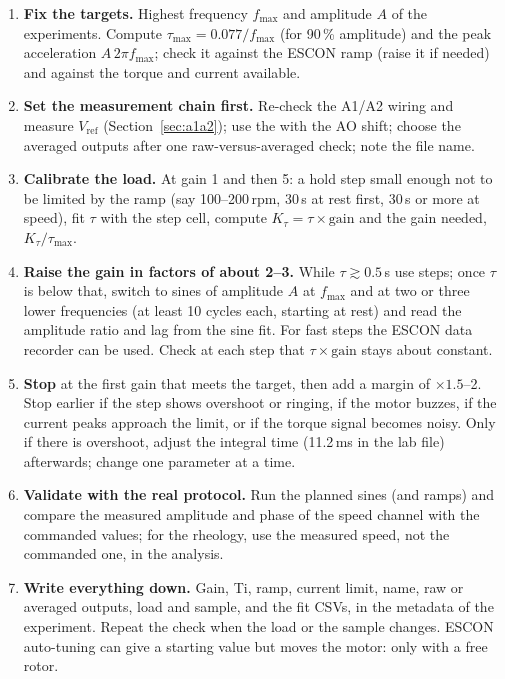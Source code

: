 \documentclass[a4paper,11pt]{article}
\newcommand{\code}[1]{\texttt{\detokenize{#1}}}
\begin{document}
\begin{enumerate}
  \item \textbf{Fix the targets.} Highest frequency $f_{\max}$ and amplitude $A$ of the experiments. Compute $\tau_{\max}=0.077/f_{\max}$ (for 90\,\% amplitude) and the peak acceleration $A\,2\pi f_{\max}$; check it against the ESCON ramp (raise it if needed) and against the torque and current available.
  \item \textbf{Set the measurement chain first.} Re-check the A1/A2 wiring and measure $V_{\mathrm{ref}}$ (Section~\ref{sec:a1a2}); use the \code{.edc} with the AO shift; choose the averaged outputs after one raw-versus-averaged check; note the \code{.edc} file name.
  \item \textbf{Calibrate the load.} At gain 1 and then 5: a hold step small enough not to be limited by the ramp (say 100--200\,rpm, 30\,s at rest first, 30\,s or more at speed), fit $\tau$ with the step cell, compute $K_\tau=\tau\times\text{gain}$ and the gain needed, $K_\tau/\tau_{\max}$.
  \item \textbf{Raise the gain in factors of about 2--3.} While $\tau\gtrsim0.5$\,s use steps; once $\tau$ is below that, switch to sines of amplitude $A$ at $f_{\max}$ and at two or three lower frequencies (at least 10 cycles each, starting at rest) and read the amplitude ratio and lag from the sine fit. For fast steps the ESCON data recorder can be used. Check at each step that $\tau\times\text{gain}$ stays about constant.
  \item \textbf{Stop} at the first gain that meets the target, then add a margin of $\times1.5$--2. Stop earlier if the step shows overshoot or ringing, if the motor buzzes, if the current peaks approach the limit, or if the torque signal becomes noisy. Only if there is overshoot, adjust the integral time (11.2\,ms in the lab file) afterwards; change one parameter at a time.
  \item \textbf{Validate with the real protocol.} Run the planned sines (and ramps) and compare the measured amplitude and phase of the speed channel with the commanded values; for the rheology, use the measured speed, not the commanded one, in the analysis.
  \item \textbf{Write everything down.} Gain, Ti, ramp, current limit, \code{.edc} name, raw or averaged outputs, load and sample, and the fit CSVs, in the metadata of the experiment. Repeat the check when the load or the sample changes. ESCON auto-tuning can give a starting value but moves the motor: only with a free rotor.
\end{enumerate}
\end{document}
